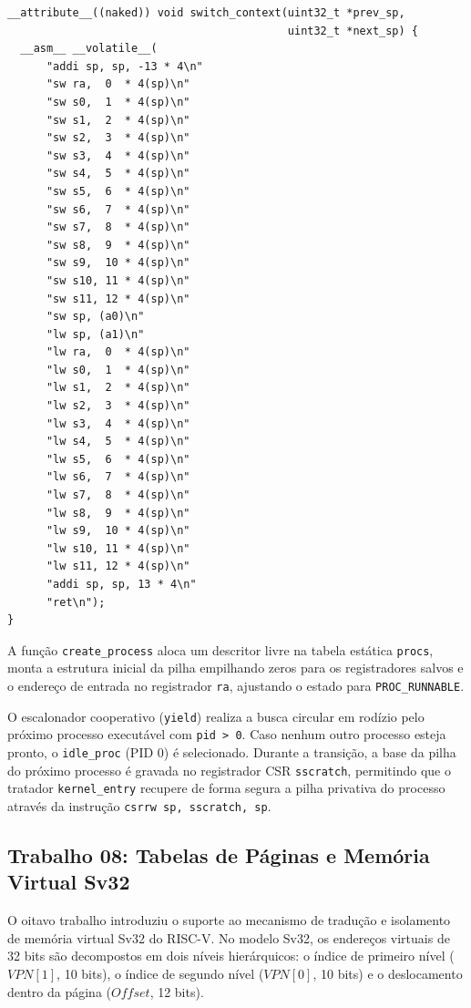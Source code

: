 \documentclass[12pt]{article}
\begin{document}
\begin{verbatim}
__attribute__((naked)) void switch_context(uint32_t *prev_sp,
                                           uint32_t *next_sp) {
  __asm__ __volatile__(
      "addi sp, sp, -13 * 4\n"
      "sw ra,  0  * 4(sp)\n"
      "sw s0,  1  * 4(sp)\n"
      "sw s1,  2  * 4(sp)\n"
      "sw s2,  3  * 4(sp)\n"
      "sw s3,  4  * 4(sp)\n"
      "sw s4,  5  * 4(sp)\n"
      "sw s5,  6  * 4(sp)\n"
      "sw s6,  7  * 4(sp)\n"
      "sw s7,  8  * 4(sp)\n"
      "sw s8,  9  * 4(sp)\n"
      "sw s9,  10 * 4(sp)\n"
      "sw s10, 11 * 4(sp)\n"
      "sw s11, 12 * 4(sp)\n"
      "sw sp, (a0)\n"
      "lw sp, (a1)\n"
      "lw ra,  0  * 4(sp)\n"
      "lw s0,  1  * 4(sp)\n"
      "lw s1,  2  * 4(sp)\n"
      "lw s2,  3  * 4(sp)\n"
      "lw s3,  4  * 4(sp)\n"
      "lw s4,  5  * 4(sp)\n"
      "lw s5,  6  * 4(sp)\n"
      "lw s6,  7  * 4(sp)\n"
      "lw s7,  8  * 4(sp)\n"
      "lw s8,  9  * 4(sp)\n"
      "lw s9,  10 * 4(sp)\n"
      "lw s10, 11 * 4(sp)\n"
      "lw s11, 12 * 4(sp)\n"
      "addi sp, sp, 13 * 4\n"
      "ret\n");
}
\end{verbatim}

A função \texttt{create\_process} aloca um descritor livre na tabela estática \texttt{procs}, monta a estrutura inicial da pilha empilhando zeros para os registradores salvos e o endereço de entrada no registrador \texttt{ra}, ajustando o estado para \texttt{PROC\_RUNNABLE}.

O escalonador cooperativo (\texttt{yield}) realiza a busca circular em rodízio pelo próximo processo executável com \texttt{pid > 0}. Caso nenhum outro processo esteja pronto, o \texttt{idle\_proc} (PID 0) é selecionado. Durante a transição, a base da pilha do próximo processo é gravada no registrador CSR \texttt{sscratch}, permitindo que o tratador \texttt{kernel\_entry} recupere de forma segura a pilha privativa do processo através da instrução \texttt{csrrw sp, sscratch, sp}.

\subsection{Trabalho 08: Tabelas de Páginas e Memória Virtual Sv32}

O oitavo trabalho introduziu o suporte ao mecanismo de tradução e isolamento de memória virtual Sv32 do RISC-V. No modelo Sv32, os endereços virtuais de 32 bits são decompostos em dois níveis hierárquicos: o índice de primeiro nível ($VPN[1]$, 10 bits), o índice de segundo nível ($VPN[0]$, 10 bits) e o deslocamento dentro da página ($Offset$, 12 bits).
\end{document}
